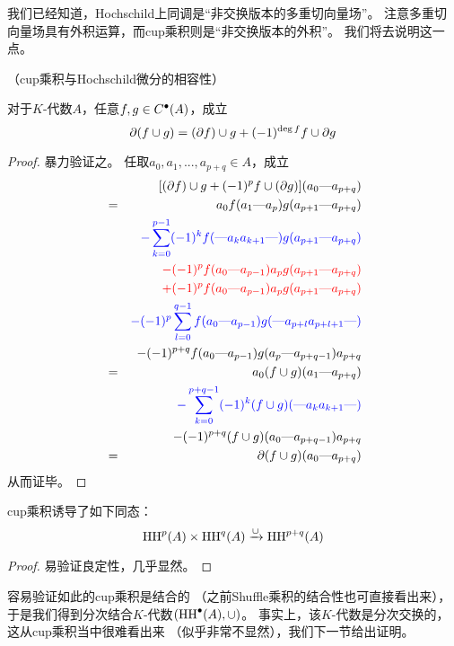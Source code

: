 我们已经知道，Hochschild上同调是“非交换版本的多重切向量场”。
注意多重切向量场具有外积运算，而cup乘积则是“非交换版本的外积”。
我们将去说明这一点。

\begin{prop}（cup乘积与Hochschild微分的相容性）

对于$K$-代数$A$，任意$f,g\in C^{\bullet}(A)$，成立
$$\partial(f\cup g)=(\partial f)\cup g+(-1)^{\deg f}f\cup\partial g$$
\end{prop}

\begin{proof}
暴力验证之。
任取$a_0,a_1,...,a_{p+q}\in A$，成立
\begin{eqnarray*}
& &
     [(\partial f)\cup g+(-1)^p f\cup(\partial g)]
     (a_0\text{---} a_{p+q})\\
&=&
     a_0f(a_1\text{---} a_p)g(a_{p+1}\text{---} a_{p+q})\\
& &
    {\color{blue}
    -\sum_{k=0}^{p-1}(-1)^k
       f(\text{---} a_ka_{k+1}\text{---})g(a_{p+1}\text{---} a_{p+q})
    }\\
& &
     {\color{red}
    -(-1)^pf(a_0\text{---} a_{p-1})a_p g(a_{p+1}\text{---} a_{p+q})
     }\\
& &
     {\color{red}
    +(-1)^pf(a_0\text{---} a_{p-1})a_p g(a_{p+1}\text{---} a_{p+q})
     }\\
& &
     {\color{blue}
    -(-1)^p\sum_{l=0}^{q-1}
            f(a_0\text{---} a_{p-1})g(\text{---} a_{p+l}a_{p+l+1}\text{---})
     }\\
& &
    -(-1)^{p+q}
    f(a_0\text{---} a_{p-1})g(a_p\text{---} a_{p+q-1})a_{p+q}\\
&=&
     a_0(f\cup g)(a_1\text{---} a_{p+q})\\
& &
     {\color{blue}
    -\sum_{k=0}^{p+q-1}(-1)^k
       (f\cup g)(\text{---} a_ka_{k+1}\text{---})
     }\\
& &
    -(-1)^{p+q}
     (f\cup g)(a_0\text{---} a_{p+q-1})a_{p+q}\\
&=&
     \partial(f\cup g)(a_0\text{---} a_{p+q})
\end{eqnarray*}
从而证毕。
\end{proof}


\begin{cor}%
cup乘积诱导了如下同态：
$$\operatorname{HH}^p(A)\times \operatorname{HH}^{q}(A)\xrightarrow{\cup} \operatorname{HH}^{p+q}(A)$$
\end{cor}
\begin{proof}
易验证良定性，几乎显然。
\end{proof}
容易验证如此的cup乘积是结合的
（之前Shuffle乘积的结合性也可直接看出来），
于是我们得到分次结合$K$-代数$(\operatorname{HH}^{\bullet}(A),\cup)$。
事实上，该$K$-代数是分次交换的，这从cup乘积当中很难看出来
（似乎非常不显然），我们下一节给出证明。

